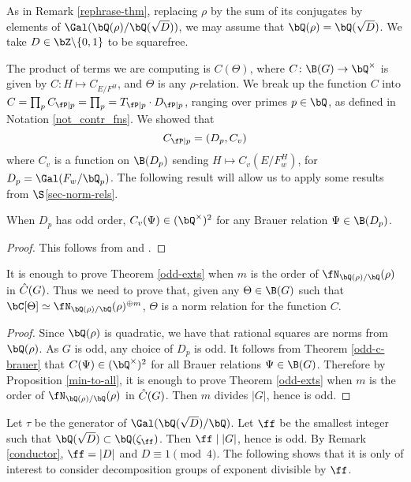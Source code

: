 As in Remark \ref{rephrase-thm}, replacing $\rho$ by the sum of its conjugates by elements of $ \Gal(\bQ(\rho) / \bQ(\sqrt{D}))$, we may assume that $\bQ(\rho) = \bQ(\sqrt{D})$. We take $D \in \bZ \backslash \{0,1 \}$ to be squarefree.

The product of terms we are computing is $C(\Theta)$, where $C \colon \B(G) \to \bQ^{\times}$ is given by $C \colon H \mapsto C_{E / F^H}$, and $\Theta$ is any $\rho$-relation.
We break up the function $C$ into $C = \prod_p C_{\fP \mid p} = \prod_p = T_{\fP \mid p} \cdot D_{\fP \mid p}$, ranging over primes $p \in \bQ$,
as defined in Notation \ref{not_contr_fns}.
We showed that
\begin{equation*}\label{Dp-loc}
C_{\fP \mid p} = (D_p, C_v)
\end{equation*}
where $C_v$ is a function on $\B(D_p)$ sending $H \mapsto C_v(E / F_w^H)$, for $D_p = \Gal(F_w / \bQ_p)$. The following result will allow us to apply some results from $\S$\ref{sec-norm-rels}.

\begin{thm}\label{odd-c-brauer}
    When $D_p$ has odd order, $C_v(\Psi) \in (\bQ^{\times})^2$ for any Brauer relation $\Psi \in \B(D_p)$. 
\end{thm}

\begin{proof}
    This follows from \cite[Theorem 2.47]{reg-const} and \cite[Theorem 3.2  (Tam)]{reg-const}.
\end{proof}

\begin{cor}
It is enough to prove Theorem \ref{odd-exts} when $m$ is the order of $\repnorm{\rho}$ in $\hat{C}(G)$. Thus we need to prove that, given any $
\Theta \in \B(G)$ such that $\bC[\Theta] \simeq \repnorm{\rho}^{\oplus m}$, $\Theta$ is a norm relation for the function $C$. 
\end{cor}

\begin{proof}
    Since $\bQ(\rho)$ is quadratic, we have that rational squares are norms from $\bQ(\rho)$. As $G$ is odd, any choice of $D_p$ is odd. It follows from Theorem \ref{odd-c-brauer} that $C(\Psi) \in (\bQ^{\times})^2$ for all Brauer relations $\Psi \in \B(G)$. Therefore by Proposition \ref{min-to-all}, it is enough to prove Theorem \ref{odd-exts} when $m$ is the order of $\repnorm{\rho}$ in $\hat{C}(G)$. Then $m$ divides $|G|$, hence is odd.
\end{proof}

Let $\tau$ be the generator of $\Gal(\bQ(\sqrt{D}) / \bQ)$.
Let $\ff$ be the smallest integer such that $\bQ(\sqrt{D}) \subset \bQ(\zeta_{\ff})$. Then $\ff \mid |G|$, hence is odd. By Remark \ref{conductor}, $\ff = |D|$ and $D \equiv 1 \pmod 4$. The following shows that it is only of interest to consider decomposition groups of exponent divisible by $\ff$.

